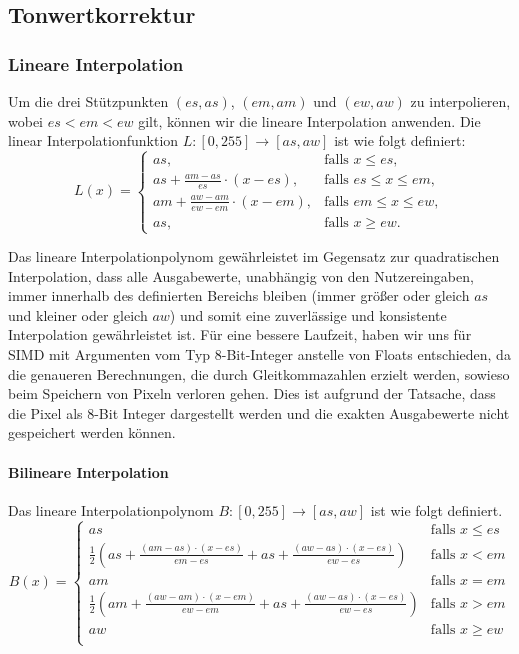 \documentclass[course=erap]{aspdoc}
\begin{document}
\subsection{Tonwertkorrektur}

\subsubsection{Lineare Interpolation}
Um die drei Stützpunkten $(es, as)$, $(em, am)$ und $(ew, aw)$ zu interpolieren, wobei $es < em < ew$ gilt, können wir die lineare Interpolation anwenden.
Die linear Interpolationfunktion \( L: [0,255] \rightarrow [as,aw] \) ist wie folgt definiert:
\[
L(x) =
\begin{cases}
  as, & \text{falls } x \leq es, \\
  as + \frac{am - as}{es} \cdot (x - es), & \text{falls } es \leq x \leq em, \\
  am + \frac{aw - am}{ew - em} \cdot (x - em), & \text{falls } em \leq x \leq ew, \\
  as, & \text{falls } x \geq ew.
\end{cases}
\]

Das lineare Interpolationpolynom gewährleistet im Gegensatz zur quadratischen Interpolation, dass alle Ausgabewerte, unabhängig von den Nutzereingaben, immer innerhalb des definierten Bereichs bleiben (immer größer oder gleich $as$ und kleiner oder gleich $aw$) und somit eine zuverlässige und konsistente Interpolation gewährleistet ist.
Für eine bessere Laufzeit, haben wir uns für SIMD mit Argumenten vom Typ 8-Bit-Integer anstelle von Floats entschieden, da die genaueren Berechnungen, die durch Gleitkommazahlen erzielt werden, sowieso beim Speichern von Pixeln verloren gehen. Dies ist aufgrund der Tatsache, dass die Pixel als 8-Bit Integer dargestellt werden und die exakten Ausgabewerte nicht gespeichert werden können.

\paragraph{Bilineare Interpolation} 
Das lineare Interpolationpolynom $B: [0,255] \rightarrow [as,aw]$ ist wie folgt definiert.
\[
  B(x) =
  \begin{cases}
      as & \text{falls } x \leq es \\
      \frac{1}{2} \left(as + \frac{{(am - as) \cdot (x - es)}}{{em - es}} + as + \frac{{(aw - as) \cdot (x - es)}}{{ew - es}}\right) & \text{falls } x < em \\
      am & \text{falls } x = em \\
      \frac{1}{2} \left(am + \frac{{(aw - am) \cdot (x - em)}}{{ew - em}} + as + \frac{{(aw - as) \cdot (x - es)}}{{ew - es}}\right) & \text{falls } x > em \\
      aw & \text{falls } x \geq ew \\
  \end{cases}
\]
  
\end{document}

